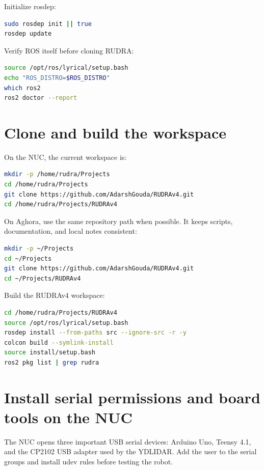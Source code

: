 Initialize rosdep:

\begin{lstlisting}[language=bash,caption={rosdep initialization.}]
sudo rosdep init || true
rosdep update
\end{lstlisting}

Verify ROS itself before cloning RUDRA:

\begin{lstlisting}[language=bash,caption={Basic ROS verification.}]
source /opt/ros/lyrical/setup.bash
echo "ROS_DISTRO=$ROS_DISTRO"
which ros2
ros2 doctor --report
\end{lstlisting}

\section{Clone and build the workspace}
On the NUC, the current workspace is:

\begin{lstlisting}[language=bash,caption={RUDRAv4 workspace path on the NUC.}]
mkdir -p /home/rudra/Projects
cd /home/rudra/Projects
git clone https://github.com/AdarshGouda/RUDRAv4.git
cd /home/rudra/Projects/RUDRAv4
\end{lstlisting}

On Aghora, use the same repository path when possible.  It keeps scripts, documentation, and local notes consistent:

\begin{lstlisting}[language=bash,caption={RUDRAv4 workspace path on Aghora.}]
mkdir -p ~/Projects
cd ~/Projects
git clone https://github.com/AdarshGouda/RUDRAv4.git
cd ~/Projects/RUDRAv4
\end{lstlisting}

Build the RUDRAv4 workspace:

\begin{lstlisting}[language=bash,caption={Build RUDRAv4.}]
cd /home/rudra/Projects/RUDRAv4
source /opt/ros/lyrical/setup.bash
rosdep install --from-paths src --ignore-src -r -y
colcon build --symlink-install
source install/setup.bash
ros2 pkg list | grep rudra
\end{lstlisting}

\section{Install serial permissions and board tools on the NUC}
The NUC opens three important USB serial devices: Arduino Uno, Teensy 4.1, and the CP2102 USB adapter used by the YDLIDAR.  Add the user to the serial groups and install udev rules before testing the robot.

